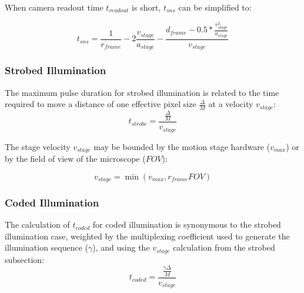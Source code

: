When camera readout time $t_{readout}$ is short, $t_{sns}$ can be simplified to:

\begin{equation*}
t_{sns} = \frac{1}{r_{frame}} - 2\frac{v_{stage}}{a_{stage}} - \frac{d_{frame} - 0.5 * \frac{v_{stage}^2}{a_{stage}}}{v_{stage}}
\end{equation*}

\subsubsection{Strobed Illumination}

The maximum pulse duration for strobed illumination is related to the time required to move a distance of one effective pixel size $\frac{\Delta}{M}$ at a velocity $v_{stage}$:
\begin{equation*}
t_{strobe} = \frac{\frac{\Delta}{M}}{v_{stage}}
\end{equation*}

The stage velocity $v_{stage}$ may be bounded by the motion stage hardware ($v_{max}$) or by the field of view of the microscope ($FOV$):

\begin{equation*}
v_{stage} = \min (v_{max}, r_{frame}FOV)
\end{equation*}

\subsubsection{Coded Illumination}
The calculation of $t_{coded}$ for coded illumination is synonymous to the strobed illumination case, weighted by the multiplexing coefficient used to generate the illumination sequence ($\gamma$), and using the $v_{stage}$ calculation from the strobed subsection:
\begin{equation*}
t_{coded} = \frac{\frac{\gamma \Delta}{M}}{v_{stage}}
\end{equation*}

